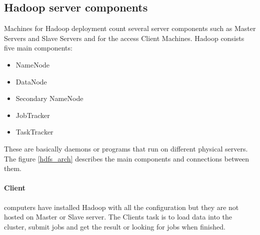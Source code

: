 \documentclass[a4paper,12pt,oneside]{report}
\begin{document}
	\subsection{Hadoop server components}
	Machines for Hadoop deployment count several server components such as Master
	Servers and Slave Servers and for the access Client Machines.  Hadoop consists
	five main components: 
	\begin{itemize}[noitemsep]
		\item NameNode
		\item DataNode
		\item Secondary NameNode
		\item JobTracker
		\item TaskTracker
	\end{itemize}
	These are basically daemons or programs that run on different physical servers.
	The figure \ref{hdfs_arch} describes the main components and connections
	between them.
	
	\paragraph{Client}
	computers have installed Hadoop with  all the configuration but they are not
	hosted on Master or Slave 
	server. The Clients task is to  load data into the cluster, submit jobs and get
	the result or looking for jobs when finished.
	
\end{document}
